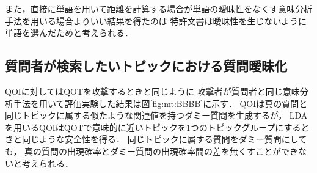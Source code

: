 \documentclass[master]{suribt}
\theoremstyle{definition}
\begin{document}
 また，直接に単語を用いて距離を計算する場合が単語の曖昧性をなくす意味分析手法を用いる場合よりいい結果を得たのは
 特許文書は曖昧性を生じないように単語を選んだためと考えられる．


 \subsection{質問者が検索したいトピックにおける質問曖昧化} 
 QOIに対してはQOTを攻撃するときと同じように
 攻撃者が質問者と同じ意味分析手法を用いて評価実験した結果は図\ref{fig:mt:BBBB}に示す．
 QOIは真の質問と同じトピックに属する似たような関連値を持つダミー質問を生成するが，
 LDAを用いるQOIはQOTで意味的に近いトピックを1つのトピックグループにするときと同じような安全性を得る．
 同じトピックに属する質問をダミー質問にしても，
 真の質問の出現確率とダミー質問の出現確率間の差を無くすことができないと考えられる．
\end{document}
